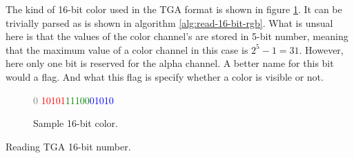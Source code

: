   The kind of 16-bit color used in the TGA format is shown in figure
  \ref{fig:tga-16-bit-colors-bits}. It can be trivially parsed as is
  shown in algorithm \ref{alg:read-16-bit-rgb}. What is unsual here is
  that the values of the color channel's are stored in 5-bit number,
  meaning that the maximum value of a color channel in this case is
  $2^5 - 1 = 31$. However, here only one bit is reserved for the alpha
  channel. A better name for this bit would a flag. And what this flag
  is specify whether a color is visible or not.

  \begin{figure}
    \centering
    {\huge\textcolor{gray}{0}%
      \textcolor{red}{10101}\textcolor{green}{11100}\textcolor{blue}{01010}}
    \caption{Sample 16-bit color.}
    \label{fig:tga-16-bit-colors-bits}
  \end{figure}


  \begin{algorithm}[H]
    \caption{Reading TGA 16-bit number.}
    \label{alg:read-16-bit-rgb}
    \begin{algorithmic}[1]
    \end{algorithmic}
  \end{algorithm}

